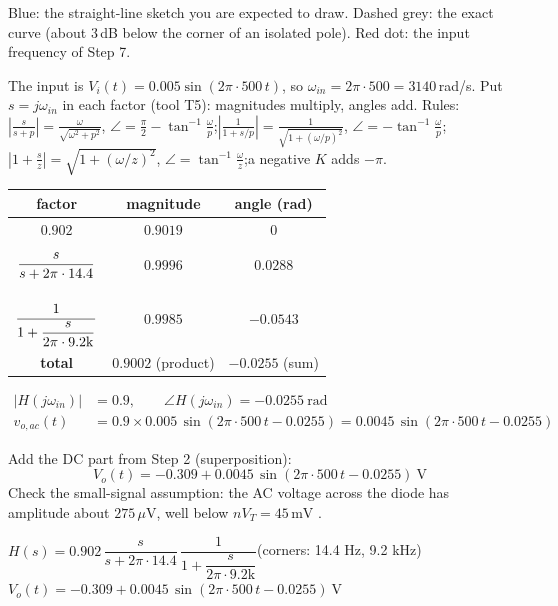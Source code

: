 \documentclass[11pt]{article}
\newcommand{\solstep}[2]{\par\medskip{\color{stepc}\textbf{Step #1 --- #2}}\par\nopagebreak}
\begin{document}
{\small Blue: the straight-line sketch you are expected to draw. Dashed grey: the exact curve (about 3\,dB below the corner of an isolated pole). Red dot: the input frequency of Step 7.}
\solstep{7}{Total output (DC + AC)}The input is $V_i(t) = 0.005\sin\left(2\pi\cdot 500\,t\right)$, so $\omega_{in} = 2\pi\cdot 500 = 3140$\,rad/s. Put $s=j\omega_{in}$ in each factor (tool T5): magnitudes multiply, angles add.
{\small Rules: $\left|\frac{s}{s+p}\right| = \frac{\omega}{\sqrt{\omega^2+p^2}}$, $\angle = \frac{\pi}{2}-\tan^{-1}\frac{\omega}{p}$;\quad $\left|\frac{1}{1+s/p}\right| = \frac{1}{\sqrt{1+(\omega/p)^2}}$, $\angle = -\tan^{-1}\frac{\omega}{p}$;\quad $\left|1+\frac{s}{z}\right| = \sqrt{1+(\omega/z)^2}$, $\angle = \tan^{-1}\frac{\omega}{z}$;\quad a negative $K$ adds $-\pi$.}
\begin{center}\renewcommand{\arraystretch}{1.35}
\begin{tabular}{ccc}
\toprule
factor & magnitude & angle (rad) \\
\midrule
$0.902$ & $0.9019$ & $0$ \\
$\rule[-1.1em]{0pt}{2.8em}\dfrac{s}{s+2\pi\cdot 14.4}$ & $0.9996$ & $0.0288$ \\
$\rule[-1.7em]{0pt}{4em}\dfrac{1}{1+\dfrac{s}{2\pi\cdot 9.2\mathrm{k}}}$ & $0.9985$ & $-0.0543$ \\
\textbf{total} & $\mathbf{0.9002}$ (product) & $\mathbf{-0.0255}$ (sum) \\
\bottomrule
\end{tabular}\end{center}

\begin{align*}
|H(j\omega_{in})| &= 0.9, \qquad \angle H(j\omega_{in}) = -0.0255\ \mathrm{rad} \\
v_{o,ac}(t) &= 0.9\times 0.005\,\sin\left(2\pi\cdot 500\,t - 0.0255\right) = 0.0045\,\sin\left(2\pi\cdot 500\,t - 0.0255\right)
\end{align*}

Add the DC part from Step 2 (superposition):
\[
\boxed{V_o(t) = -0.309 + 0.0045\,\sin\left(2\pi\cdot 500\,t - 0.0255\right)\ \mathrm{V}}
\]
 Check the small-signal assumption: the AC voltage across the diode has amplitude about $275\,\mu \mathrm{V}$, well below $nV_T = 45\,\mathrm{m}\mathrm{V}$ \checkmark.
\begin{ansbox}
$H(s) = 0.902\,\dfrac{s}{s+2\pi\cdot 14.4}\,\dfrac{1}{1+\dfrac{s}{2\pi\cdot 9.2\mathrm{k}}}$\quad (corners: 14.4 Hz, 9.2 kHz)\\[4pt]
$V_o(t) = -0.309 + 0.0045\,\sin\left(2\pi\cdot 500\,t - 0.0255\right)\ \mathrm{V}$
\end{ansbox}
\end{document}

